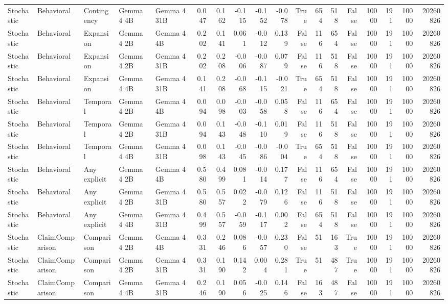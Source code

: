\begin{tabular}{lllllrrrrrrrrrrrrr}
Stochastic & Behavioral & Contingency & Gemma 4 4B & Gemma 4 31B & 0.047 & 0.162 & -0.115 & -0.152 & -0.078 & True & 654 & 518 & False & 10000 & 191 & 10000 & 20260826 \\
Stochastic & Behavioral & Expansion & Gemma 4 2B & Gemma 4 4B & 0.202 & 0.141 & 0.061 & -0.012 & 0.139 & False & 116 & 654 & False & 10000 & 191 & 10000 & 20260826 \\
Stochastic & Behavioral & Expansion & Gemma 4 2B & Gemma 4 31B & 0.202 & 0.208 & -0.006 & -0.087 & 0.079 & False & 116 & 518 & False & 10000 & 191 & 10000 & 20260826 \\
Stochastic & Behavioral & Expansion & Gemma 4 4B & Gemma 4 31B & 0.141 & 0.208 & -0.068 & -0.115 & -0.021 & True & 654 & 518 & False & 10000 & 191 & 10000 & 20260826 \\
Stochastic & Behavioral & Temporal & Gemma 4 2B & Gemma 4 4B & 0.094 & 0.098 & -0.003 & -0.058 & 0.058 & False & 116 & 654 & False & 10000 & 191 & 10000 & 20260826 \\
Stochastic & Behavioral & Temporal & Gemma 4 2B & Gemma 4 31B & 0.094 & 0.143 & -0.048 & -0.110 & 0.019 & False & 116 & 518 & False & 10000 & 191 & 10000 & 20260826 \\
Stochastic & Behavioral & Temporal & Gemma 4 4B & Gemma 4 31B & 0.098 & 0.143 & -0.045 & -0.086 & -0.004 & True & 654 & 518 & False & 10000 & 191 & 10000 & 20260826 \\
Stochastic & Behavioral & Any explicit & Gemma 4 2B & Gemma 4 4B & 0.580 & 0.499 & 0.081 & -0.014 & 0.177 & False & 116 & 654 & False & 10000 & 191 & 10000 & 20260826 \\
Stochastic & Behavioral & Any explicit & Gemma 4 2B & Gemma 4 31B & 0.580 & 0.557 & 0.022 & -0.079 & 0.126 & False & 116 & 518 & False & 10000 & 191 & 10000 & 20260826 \\
Stochastic & Behavioral & Any explicit & Gemma 4 4B & Gemma 4 31B & 0.499 & 0.557 & -0.059 & -0.117 & 0.002 & False & 654 & 518 & False & 10000 & 191 & 10000 & 20260826 \\
Stochastic & ClaimComparison & Comparison & Gemma 4 2B & Gemma 4 4B & 0.331 & 0.246 & 0.086 & -0.057 & 0.230 & False & 51 & 163 & True & 10000 & 191 & 10000 & 20260826 \\
Stochastic & ClaimComparison & Comparison & Gemma 4 2B & Gemma 4 31B & 0.331 & 0.190 & 0.142 & 0.004 & 0.281 & True & 51 & 487 & True & 10000 & 191 & 10000 & 20260826 \\
Stochastic & ClaimComparison & Comparison & Gemma 4 4B & Gemma 4 31B & 0.246 & 0.190 & 0.056 & -0.025 & 0.146 & False & 163 & 487 & False & 10000 & 191 & 10000 & 20260826 \\

\end{tabular}
